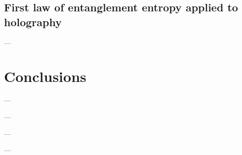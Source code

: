 \documentclass[twocolumn]{revtex4}
\begin{document}
\subsection{First law of entanglement entropy applied to holography} \label{ss:FLEE_H}

---


\section{Conclusions} \label{s:Conclusions}

---


\begin{acknowledgments}

---

---

---
    
\end{acknowledgments}




\end{document}
